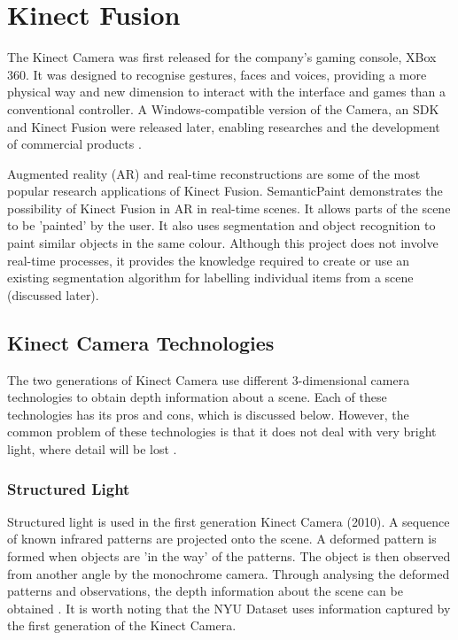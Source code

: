 \documentclass[11pt,openright,a4paper]{report}
\begin{document}
\chapter{Kinect Fusion}
The Kinect Camera was first released for the company's gaming console, XBox 360. It was designed to recognise gestures, faces and voices, providing a more physical way and new dimension to interact with the interface and games than a conventional controller. A Windows-compatible version of the Camera, an SDK and Kinect Fusion were released later, enabling researches and the development of commercial products \cite{kinect-doc}. 

Augmented reality (AR) and real-time reconstructions are some of the most popular research applications of Kinect Fusion. SemanticPaint \cite{semantic-paint} demonstrates the possibility of Kinect Fusion in AR in real-time scenes. It allows parts of the scene to be 'painted' by the user. It also uses segmentation and object recognition to paint similar objects in the same colour. Although this project does not involve real-time processes, it provides the knowledge required to create or use an existing segmentation algorithm for labelling individual items from a scene (discussed later). 

\section{Kinect Camera Technologies}
The two generations of Kinect Camera use different 3-dimensional camera technologies to obtain depth information about a scene. Each of these technologies has its pros and cons, which is discussed below. However, the common problem of these technologies is that it does not deal with very bright light, where detail will be lost \cite{chi-book}. 

\subsection{Structured Light}
Structured light is used in the first generation Kinect Camera (2010). A sequence of known infrared patterns are projected onto the scene. A deformed pattern is formed when objects are 'in the way' of the patterns. The object is then observed from another angle by the monochrome camera. Through analysing the deformed patterns and observations, the depth information about the scene can be obtained \cite{chi-book}\cite{kinect-cam-tech}. It is worth noting that the NYU Dataset \cite{nyu-dataset} uses information captured by the first generation of the Kinect Camera.
\end{document}
